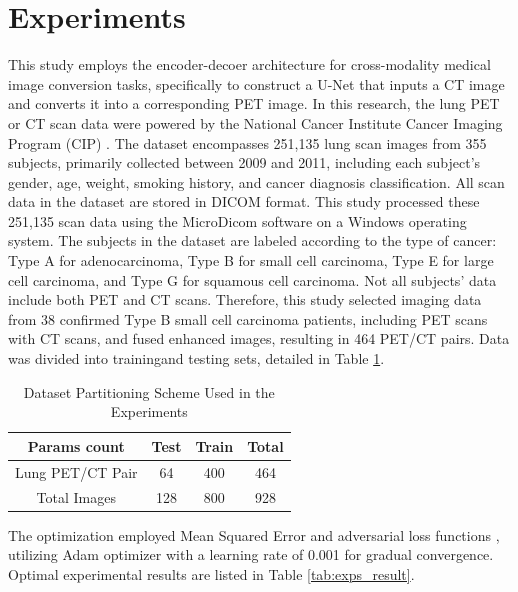\documentclass[a4paper, times, 10pt,twocolumn]{article}
\begin{document}
\section{Experiments}
This study employs the encoder-decoer architecture for cross-modality medical image conversion tasks, specifically to construct a U-Net that inputs a CT image and converts it into a corresponding PET image. In this research, the lung PET or CT scan data were powered by the National Cancer Institute Cancer Imaging Program (CIP) \cite{li_large-scale_2020}.  The dataset encompasses 251,135 lung scan images from 355 subjects, primarily collected between 2009 and 2011, including each subject's gender, age, weight, smoking history, and cancer diagnosis classification. All scan data in the dataset are stored in DICOM format. This study processed these 251,135 scan data using the MicroDicom software on a Windows operating system. The subjects in the dataset are labeled according to the type of cancer: Type A for adenocarcinoma, Type B for small cell carcinoma, Type E for large cell carcinoma, and Type G for squamous cell carcinoma. Not all subjects' data include both PET and CT scans. Therefore, this study selected imaging data from 38 confirmed Type B small cell carcinoma patients, including PET scans with CT scans, and fused enhanced images, resulting in 464 PET/CT pairs. Data was divided into trainingand testing sets, detailed in Table \ref{tab:dataset_partition_1}.

\begin{table}[h]
	\centering
	\caption{Dataset Partitioning Scheme Used in the Experiments}
	\label{tab:dataset_partition_1}
	\begin{tabular}{cccc}
		\hline
		Params count     & Test & Train & Total \\
		\hline
		Lung PET/CT Pair & 64   & 400   & 464   \\
		Total Images     & 128  & 800   & 928   \\
		\hline
	\end{tabular}
\end{table}

The optimization employed Mean Squared Error and adversarial loss functions \cite{pan_loss_2020}, utilizing Adam optimizer\cite{zhang_improved_2018} with a learning rate of 0.001 for gradual convergence. Optimal experimental results are listed in Table \ref{tab:exps_result}.
\end{document}
